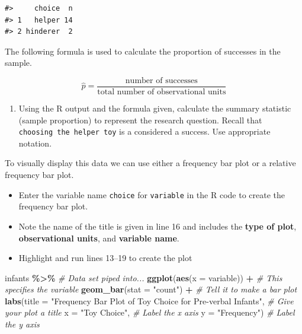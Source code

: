 \documentclass[
]{report}
\newenvironment{Shaded}{\begin{snugshade}}{\end{snugshade}}
\newcommand{\AttributeTok}[1]{\textcolor[rgb]{0.13,0.29,0.53}{#1}}
\newcommand{\CommentTok}[1]{\textcolor[rgb]{0.56,0.35,0.01}{\textit{#1}}}
\newcommand{\FunctionTok}[1]{\textcolor[rgb]{0.13,0.29,0.53}{\textbf{#1}}}
\newcommand{\NormalTok}[1]{#1}
\newcommand{\SpecialCharTok}[1]{\textcolor[rgb]{0.81,0.36,0.00}{\textbf{#1}}}
\newcommand{\StringTok}[1]{\textcolor[rgb]{0.31,0.60,0.02}{#1}}
\providecommand{\tightlist}{%
  \setlength{\itemsep}{0pt}\setlength{\parskip}{0pt}}
\begin{document}
\begin{verbatim}
#>     choice  n
#> 1   helper 14
#> 2 hinderer  2
\end{verbatim}

The following formula is used to calculate the proportion of successes in the sample.

\[\hat{p} = \frac{\mbox{number of successes}}{\mbox{total number of observational units}}\]
\newpage

\begin{enumerate}
\def\labelenumi{\arabic{enumi}.}
\setcounter{enumi}{1}
\tightlist
\item
  Using the R output and the formula given, calculate the summary statistic (sample proportion) to represent the research question. Recall that \texttt{choosing\ the\ helper\ toy} is a considered a success. Use appropriate notation.
\end{enumerate}

\vspace{0.5in}

To visually display this data we can use either a frequency bar plot or a relative frequency bar plot.

\begin{itemize}
\item
  Enter the variable name \texttt{choice} for \texttt{variable} in the R code to create the frequency bar plot.
\item
  Note the name of the title is given in line 16 and includes the \textbf{type of plot}, \textbf{observational units}, and \textbf{variable name}.
\item
  Highlight and run lines 13--19 to create the plot
\end{itemize}

\begin{Shaded}
\begin{Highlighting}[]
\NormalTok{infants }\SpecialCharTok{\%\textgreater{}\%} \CommentTok{\# Data set piped into...}
    \FunctionTok{ggplot}\NormalTok{(}\FunctionTok{aes}\NormalTok{(}\AttributeTok{x =}\NormalTok{ variable)) }\SpecialCharTok{+}   \CommentTok{\# This specifies the variable}
    \FunctionTok{geom\_bar}\NormalTok{(}\AttributeTok{stat =} \StringTok{"count"}\NormalTok{) }\SpecialCharTok{+}  \CommentTok{\# Tell it to make a bar plot}
    \FunctionTok{labs}\NormalTok{(}\AttributeTok{title =} \StringTok{"Frequency Bar Plot of Toy Choice for Pre{-}verbal Infants"}\NormalTok{,  }
       \CommentTok{\# Give your plot a title}
       \AttributeTok{x =} \StringTok{"Toy Choice"}\NormalTok{,   }\CommentTok{\# Label the x axis}
       \AttributeTok{y =} \StringTok{"Frequency"}\NormalTok{)  }\CommentTok{\# Label the y axis}
\end{Highlighting}
\end{Shaded}
\end{document}
